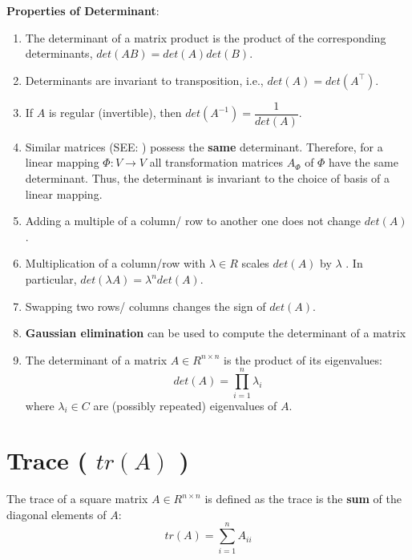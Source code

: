 \noindent \textbf{Properties of Determinant}:
\begin{enumerate}
    \item The determinant of a matrix product is the product of the corresponding determinants, $det(AB) = det(A)det(B)$.

    \item Determinants are invariant to transposition, i.e., $det(A) = det(A^\top)$.

    \item If $A$ is regular (invertible), then $\displaystyle det(A^{-1}) = \displaystyle\dfrac{1}{det(A)}$.

    \item Similar matrices (SEE: ) possess the \textbf{same} determinant. Therefore, for a linear mapping $\Phi : V \to V$ all transformation matrices $A_\Phi$ of $\Phi$ have the same determinant. Thus, the determinant is invariant to the choice of basis of a linear mapping.

    \item Adding a multiple of a column/ row to another one does not change $det(A)$.

    \item Multiplication of a column/row with $\lambda  \in R$ scales $det(A)$ by $\lambda$ . In particular, $det(\lambda A) = \lambda ^n det(A)$.

    \item Swapping two rows/ columns changes the sign of $det(A)$.

    \item \textbf{Gaussian elimination} can be used to compute the determinant of a matrix

    \item The determinant of a matrix $A \in R^{n\times n}$ is the product of its eigenvalues:
    \[
        det(A) = \prod_{i=1}^{n} \lambda_i
    \]
    where $\lambda_i \in C$ are (possibly repeated) eigenvalues of $A$.

\end{enumerate}


\section{Trace ( $tr(A)$ )}\label{matrix: Trace}
The trace of a square matrix $A \in R^{n\times n}$ is defined as the trace is the \textbf{sum} of the diagonal elements of $A$:
\[
    tr(A) = \sum_{i=1}^{n} A_{ii}
\]

